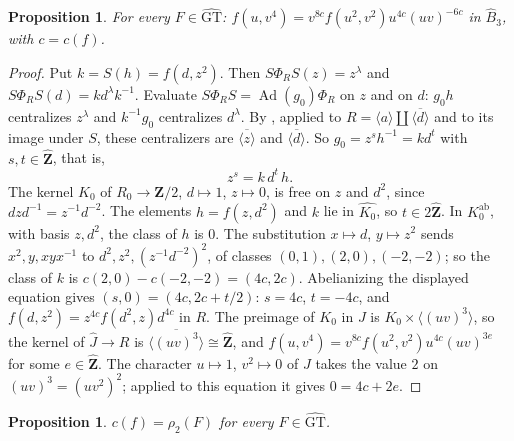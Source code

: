 \documentclass[11pt,a4paper]{article}
\theoremstyle{plain}
\newtheorem{proposition}[theorem]{Proposition}
\theoremstyle{definition}
\theoremstyle{remark}
\newcommand{\GT}{\widehat{\mathrm{GT}}}
\newcommand{\Zh}{\widehat{\mathbf Z}}
\newcommand{\Z}{\mathbf Z}
\newcommand{\Bh}{\widehat B}
\newcommand{\Ad}{\operatorname{Ad}}
\newcommand{\ab}{\mathrm{ab}}
\begin{document}
\begin{proposition}\label{prop:IVc}
For every $F\in\GT$: $f(u,v^4)=v^{8c}f(u^2,v^2)u^{4c}(uv)^{-6c}$ in $\Bh_3$, with $c=c(f)$.
\end{proposition}

\begin{proof}
Put $k=S(h)=f(d,z^2)$. Then $S\Phi_RS(z)=z^\lambda$ and $S\Phi_RS(d)=kd^\lambda k^{-1}$. Evaluate
$S\Phi_RS=\Ad(g_0)\Phi_R$ on $z$ and on $d$: $g_0h$ centralizes $z^\lambda$ and $k^{-1}g_0$ centralizes
$d^\lambda$. By \cite{HR}, applied to $R=\langle a\rangle\amalg\overline{\langle d\rangle}$ and to its image under
$S$, these centralizers are $\overline{\langle z\rangle}$ and $\overline{\langle d\rangle}$. So
$g_0=z^sh^{-1}=kd^t$ with $s,t\in\Zh$, that is,
\[
 z^s=k\,d^t\,h.
\]
The kernel $K_0$ of $R_0\to\Z/2$, $d\mapsto1$, $z\mapsto0$, is free on $z$ and $d^2$, since $dzd^{-1}=z^{-1}d^{-2}$.
The elements $h=f(z,d^2)$ and $k$ lie in $\widehat{K_0}$, so $t\in2\Zh$. In $K_0^{\ab}$, with basis $z,d^2$, the
class of $h$ is $0$. The substitution $x\mapsto d$, $y\mapsto z^2$ sends $x^2,y,xyx^{-1}$ to
$d^2,z^2,(z^{-1}d^{-2})^2$, of classes $(0,1),(2,0),(-2,-2)$; so the class of $k$ is $c(2,0)-c(-2,-2)=(4c,2c)$.
Abelianizing the displayed equation gives $(s,0)=(4c,2c+t/2)$: $s=4c$, $t=-4c$, and
$f(d,z^2)=z^{4c}f(d^2,z)d^{4c}$ in $R$. The preimage of $K_0$ in $J$ is $K_0\times\langle(uv)^3\rangle$, so the
kernel of $\widehat J\to R$ is $\overline{\langle(uv)^3\rangle}\cong\Zh$, and
$f(u,v^4)=v^{8c}f(u^2,v^2)u^{4c}(uv)^{3e}$ for some $e\in\Zh$. The character $u\mapsto1$, $v^2\mapsto0$ of $J$ takes
the value $2$ on $(uv)^3=(uv^2)^2$; applied to this equation it gives $0=4c+2e$.
\end{proof}

\begin{proposition}\label{prop:c}
$c(f)=\rho_2(F)$ for every $F\in\GT$.
\end{proposition}
\end{document}
